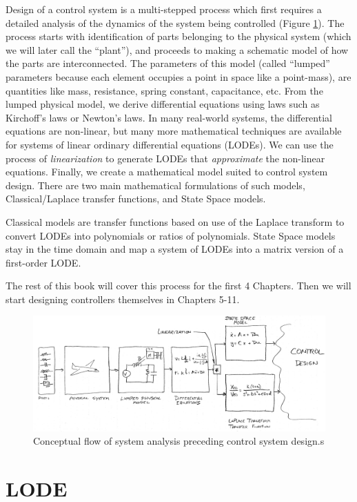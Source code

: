 Design of a control system is a multi-stepped process which first requires a detailed analysis of the dynamics of
the system being controlled (Figure \ref{fig_control_design_flow}).  The process starts with identification of parts belonging
to the physical system (which we will later call the ``plant''), and proceeds to making a schematic model of
how the parts are interconnected.   The parameters of this model (called ``lumped'' parameters because each element
occupies a point in space like a point-mass), are quantities like mass, resistance, spring constant, capacitance, etc.
From the lumped physical model, we derive differential equations using laws such as Kirchoff's laws or Newton's laws.
In many real-world systems, the differential equations are non-linear, but many more mathematical techniques are available
for systems of linear ordinary differential equations (LODEs).  We can use the process of {\it linearization} to generate  LODEs
that {\it approximate} the non-linear equations.    Finally, we create a mathematical model suited to control system design.
There are two main mathematical formulations of such models, Classical/Laplace transfer functions, and State Space models.

Classical models are transfer functions based on use of the Laplace transform to convert LODEs into polynomials or ratios
of polynomials.   State Space models stay in the time domain and map a system of LODEs into a matrix version of a first-order
LODE.

The rest of this book will cover this process for the first 4 Chapters.  Then we will start designing controllers themselves
in Chapters 5-11.

\begin{figure}\centering
\includegraphics[width=6.45in]{figs01/01115.png}
\caption{Conceptual flow of system analysis preceding control system design.s}\label{fig_control_design_flow}
\end{figure}


\section{LODE}
